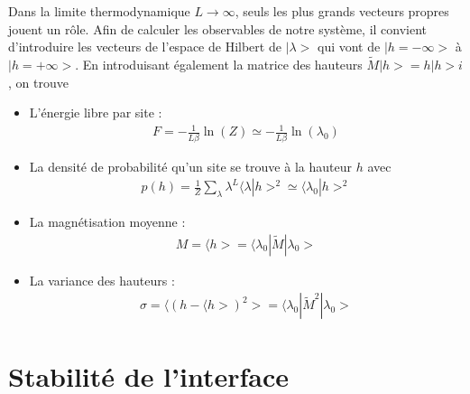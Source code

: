 Dans la limite thermodynamique $L \to \infty$, seuls les plus grands vecteurs propres jouent un rôle. Afin de calculer les observables de notre système, il convient d'introduire les vecteurs de l'espace de Hilbert de ${|\lambda>}$ qui vont de $|h = -\infty>$ à $|h = +\infty>$.
En introduisant également la matrice des hauteurs $\tilde{M} |h> = h |h> i$, on trouve
\begin{itemize}
	\item L'énergie libre par site :  
	\begin{align}
		F =  - \frac{1}{L \beta} \ln(Z) \simeq - \frac{1}{L \beta } \ln( \lambda_0)
	\end{align}
	\item La densité de probabilité qu'un site se trouve à la hauteur $h$ avec
	\begin{align}
		p(h) = \frac{1}{Z} \sum_\lambda \lambda^L \langle\lambda | h >^2 \simeq \langle \lambda_0 | h >^2
	\end{align}
	\item La magnétisation moyenne :
	\begin{align}
		M = \langle h > = \langle \lambda_0 | \tilde{M} | \lambda_0 > 
	\end{align}
	\item La variance des hauteurs :
	\begin{align}
		\sigma = \langle (h - \langle h >)^2 > =  \langle \lambda_0 | \tilde{M}^2 | \lambda_0 >
	\end{align}
\end{itemize}

	\section{Stabilité de l'interface}

